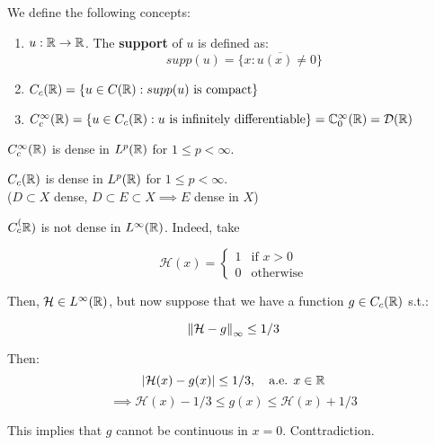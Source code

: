 \vspace{1em}

\begin{fdefinition}
    We define the following concepts:
    \vspace{1em}
    \begin{enumerate}
        \item $u: \mathbb{R} \to \mathbb{R}$. The \textbf{support} of $u$ is defined as:
        $$supp(u) = \overline{\{x: u(x) \neq 0\}}$$
        
        \item $C_c(\mathbb{R}) = \{u \in C(\mathbb{R}): supp(u) \text{ is compact}\}$
        \vspace{1em}

        \item $C_c^{\infty}(\mathbb{R}) = \{u \in C_c(\mathbb{R}): u \text{ is infinitely differentiable}\} = \mathbb{C}_0^{\infty}(\mathbb{R}) = \mathcal{D}(\mathbb{R})$
    \end{enumerate}
\end{fdefinition}

\begin{ftheorem}
    $C_c^{\infty}(\mathbb{R})$ is dense in $L^p(\mathbb{R})$ for $1 \leq p < \infty$.
\end{ftheorem}

\begin{fcorollary}
    $C_c(\mathbb{R})$ is dense in $L^p(\mathbb{R})$ for $1 \leq p < \infty$.\\

    ($D \subset X$ dense, $D \subset E \subset X \implies E$ dense in $X$)
\end{fcorollary}

\vspace{1em}

\begin{fremark}
    $C_c^(\mathbb{R})$ is not dense in $L^{\infty}(\mathbb{R})$. Indeed, take

    $$\mathcal{H}(x) = \begin{cases}
        1 & \text{if } x > 0 \\
        0 & \text{otherwise}
    \end{cases}
    $$

    Then, $\mathcal{H} \in L^{\infty}(\mathbb{R})$, but now suppose that we have 
    a function $g \in C_c(\mathbb{R})$ s.t.: 
    
    $$\left\|\mathcal{H} - g\right\|_{\infty} \leq 1/3 $$

    Then:
    $$|\mathcal{H}(x) - g(x)| \leq 1/3, \quad \text{a.e. } x \in \mathbb{R}$$
    $$\implies \mathcal{H}(x) - 1/3 \leq g(x) \leq \mathcal{H}(x) + 1/3$$

    This implies that $g$ cannot be continuous in $x = 0$. Conttradiction.
\end{fremark}

